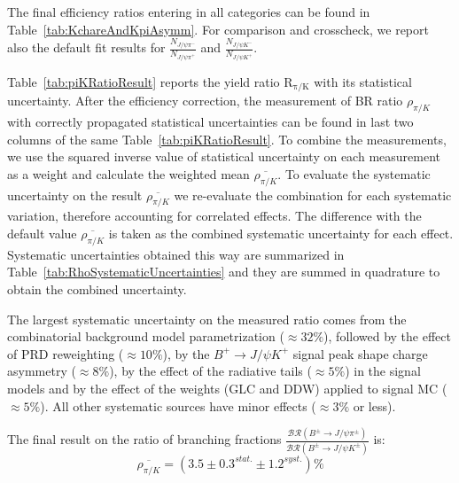 The final efficiency ratios entering in all categories can be found in
Table~\ref{tab:KchareAndKpiAsymm}. For comparison and crosscheck, we report also the
default fit results for $\frac{N_{J/\psi \pi^{-}}}{N_{J/\psi \pi^{+}}}$ and
$\frac{N_{J/\psi K^{-}}}{N_{J/\psi K^{+}}}$.

\begin{table}[!htb]
    \begin{center}
	\label{tab:KchareAndKpiAsymm}
    \end{center}
\end{table}

Table~\ref{tab:piKRatioResult} reports the yield ratio $\mathrm{R_{\pi/K}}$
with its statistical uncertainty.
After the efficiency correction, the measurement of BR ratio
$\rho_{\pi/K}$ with correctly propagated statistical uncertainties
can be found in last two columns of the same Table~\ref{tab:piKRatioResult}.
To combine the measurements, we use the squared inverse value of statistical
uncertainty on each measurement as a weight and calculate the weighted mean
$\overline{\rho_{\pi/K}}$.
To evaluate the systematic uncertainty on the result $\overline{\rho_{\pi/K}}$
we re-evaluate the combination for each systematic variation,
therefore accounting for correlated effects.
The difference with the default value $\overline{\rho_{\pi/K}}$ is taken as
the combined systematic uncertainty for each effect.
Systematic uncertainties obtained this way are summarized in
Table~\ref{tab:RhoSystematicUncertainties} and they are summed
in quadrature to obtain the combined uncertainty.

\begin{table}[!htb]
    \begin{center}
	\label{tab:piKRatioResult}
    \end{center}
\end{table}

The largest systematic uncertainty on the measured ratio comes from the
combinatorial background model parametrization ($\approx 32\%$), followed 
by the effect of PRD reweighting ($\approx 10\%$), by the
$B^{+} \rightarrow J/\psi K^{+}$ signal peak shape charge asymmetry ($\approx 8\%$), by the effect of the radiative tails ($\approx 5\%$) in the signal models and by the effect of the weights (GLC and DDW) applied to signal MC ($\approx 5\%$).
All other systematic sources have minor effects ($\approx 3\%$ or less).

\begin{table}[!htb]
    \begin{center}
	\label{tab:RhoSystematicUncertainties}
    \end{center}
\end{table}

The final result on the ratio of branching fractions
$\frac{\mathcal{BR}(B^{\pm} \to J/\psi \pi^{\pm} )}{\mathcal{BR}(B^{\pm} \to J/\psi K^{\pm}) }$
is:
\begin{equation}
    \overline{\rho_{\pi/K}} = (3.5 \pm 0.3^{stat.} \pm 1.2^{syst.})\%
\end{equation}

\clearpage
